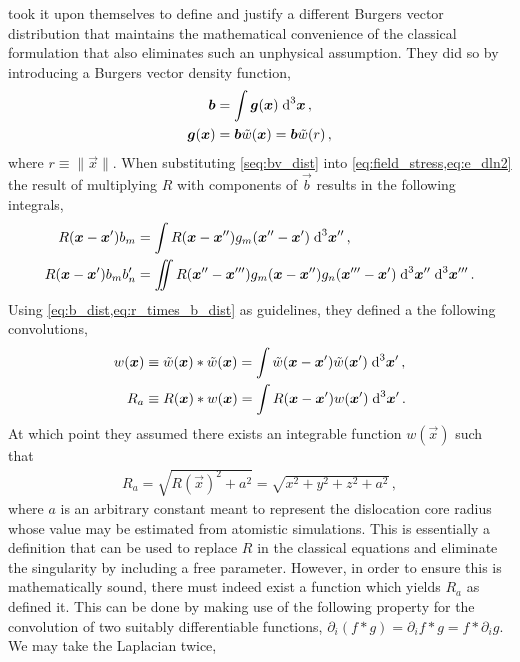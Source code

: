  took it upon themselves to define and justify a different Burgers vector distribution that maintains the mathematical convenience of the classical formulation that also eliminates such an unphysical assumption. They did so by introducing a Burgers vector density function,
\begin{subequations}\label{eq:b_dist}
	\begin{align}
		\vec{b}          & = \int \vec{g}(\vec{x}) \;\rvar{d}^{3} \vec{x}\label{seq:bv_dist}\,, \\
		\vec{g}(\vec{x}) & = \vec{b} \tilde{w}(\vec{x}) = \vec{b} \tilde{w}(r)\,,
	\end{align}
\end{subequations}
where $ r \equiv \lVert \vec{x} \rVert $. When substituting \cref{seq:bv_dist} into \cref{eq:field_stress,eq:e_dln2} the result of multiplying $ R $ with components of $ \vec{b} $ results in the following integrals,
\begin{subequations}\label{eq:r_times_b_dist}
	\begin{align}
		R(\vec{x} - \vec{x}') b_{m}        & = \int R(\vec{x} - \vec{x}'') g_{m}(\vec{x}'' - \vec{x}') \;\rvar{d}^{3}\vec{x}''\,,                                                          \\
		R(\vec{x} - \vec{x}') b_{m} b'_{n} & = \iint R(\vec{x}'' - \vec{x}''') g_{m}(\vec{x} - \vec{x}'') g_{n}(\vec{x}''' - \vec{x}') \;\rvar{d}^{3}\vec{x}'' \;\rvar{d}^{3}\vec{x}'''\,.
	\end{align}
\end{subequations}
Using \cref{eq:b_dist,eq:r_times_b_dist} as guidelines, they defined a the following convolutions,
\begin{subequations}
	\begin{align}
		w(\vec{x}) & \equiv \tilde{w}(\vec{x}) * \tilde{w}(\vec{x}) = \int \tilde{w}(\vec{x}-\vec{x}')\tilde{w}(\vec{x}')\; \rvar{d}^{3} \vec{x}'\,, \\
		R_{a}      & \equiv R(\vec{x}) * w(\vec{x}) = \int R(\vec{x} - \vec{x}') w(\vec{x}') \;\rvar{d}^{3} \vec{x}'\,.
	\end{align}
\end{subequations}
At which point they assumed there exists an integrable function $ w(\vec{x}) $ such that
\begin{align}
	R_{a} = \sqrt{R(\vec{x})^{2} + a^{2}} = \sqrt{x^{2} + y^{2} + z^{2} + a^{2}}\,,
\end{align}
where $ a $ is an arbitrary constant meant to represent the dislocation core radius whose value may be estimated from atomistic simulations. This is essentially a definition that can be used to replace $ R $ in the classical equations and eliminate the singularity by including a free parameter. However, in order to ensure this is mathematically sound, there must indeed exist a function which yields $ R_{a} $ as \citet{a_non-singular_continuum_theory_of_dislocations} defined it. This can be done by making use of the following property for the convolution of two suitably differentiable functions, $ \partial_{i} (f*g) = \partial_{i}f * g = f * \partial_{i} g $. We may take the Laplacian twice,

